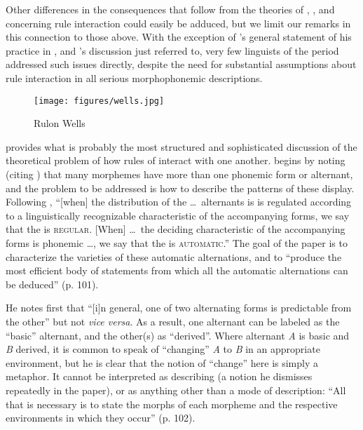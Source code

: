 Other differences in the consequences that follow from the theories of
{\Sapir}, {\Bloomfield}, and {\Harris} concerning rule interaction could easily
be adduced, but we limit our remarks in this connection to those
above. With the exception of {\Bloomfield}'s general statement of his
practice in
\citealt{bloomfield:menomini_morphophonemics,bloomfield62:menomini},
and {\Harris}'s discussion just referred to, very few linguists of the
period addressed such issues directly, despite the need for
substantial assumptions about rule interaction in all serious
morphophonemic descriptions.

\begin{wrapfigure}[13]{l}{.3\textwidth}
  \texttt{[image: figures/wells.jpg]}
  \caption{Rulon Wells}
  \label{fig:ch.structuralists.wells}
\end{wrapfigure}
\citet{wells49:automatic} provides what is probably the most
structured and sophisticated discussion of the theoretical problem of
how rules of  interact with one another. {\Wells} begins by
noting (citing \citealt{harris42:alternants}) that many morphemes have
more than one phonemic form or alternant, and the problem to be
addressed is how to describe the patterns of  these
display. Following \citet[211]{bloomfield:lg}, ``[when] the
distribution of the \ldots\ alternants is is regulated according to a
linguistically recognizable characteristic of the accompanying forms,
we say that the  is \textsc{regular}. [When] \ldots\ the
deciding characteristic of the accompanying forms is phonemic \ldots,
we say that the  is \textsc{automatic}.'' The goal of the
paper is to characterize the varieties of these automatic
alternations, and to ``produce the most efficient body of statements
from which all the automatic alternations can be deduced'' (p. 101). 

He notes first that ``[i]n general, one of two alternating forms is
predictable from the other'' but not \emph{vice versa}. As a result,
one alternant can be labeled as the ``basic'' alternant, and the
other(s) as ``derived''. Where alternant \emph{A} is basic and
\emph{B} derived, it is common to speak of ``changing'' \emph{A} to
\emph{B} in an appropriate environment, but he is clear that the notion
of ``change'' here is simply a metaphor. It cannot be interpreted as
describing  (a notion he dismisses repeatedly in the
paper), or as anything other than a mode of description: ``All that is
necessary is to state the morphs of each morpheme and the respective
environments in which they occur'' (p. 102).

